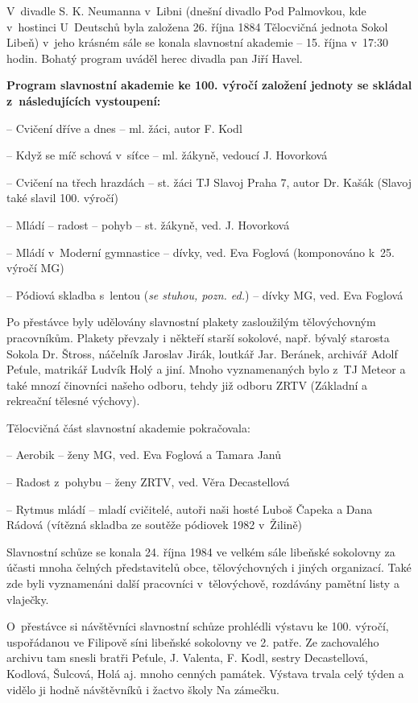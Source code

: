 \documentclass[a5paper, 12pt, twoside]{article}
\begin{document}
V~divadle S. K. Neumanna v~Libni (dnešní divadlo Pod Palmovkou, kde
v~hostinci U~Deutschů byla založena 26. října 1884 Tělocvičná jednota
Sokol Libeň) v~jeho krásném sále se konala slavnostní akademie -- 15.
října v~17:30 hodin. Bohatý program uváděl herec divadla pan Jiří Havel.

\textbf{Program slavnostní akademie ke 100. výročí založení jednoty se
skládal z~následujících vystoupení:}

-- Cvičení dříve a dnes -- ml. žáci, autor F. Kodl

-- Když se míč schová v~síťce -- ml. žákyně, vedoucí J. Hovorková

-- Cvičení na třech hrazdách -- st. žáci TJ Slavoj Praha 7, autor Dr.
Kašák (Slavoj také slavil 100. výročí)

-- Mládí -- radost -- pohyb -- st. žákyně, ved. J. Hovorková

-- Mládí v~Moderní gymnastice -- dívky, ved. Eva Foglová (komponováno
k~25. výročí MG)

-- Pódiová skladba s~lentou (\textit{se stuhou, pozn. ed.}) -- dívky MG,
ved. Eva Foglová

Po přestávce byly udělovány slavnostní plakety zasloužilým tělovýchovným
pracovníkům. Plakety převzaly i někteří starší sokolové, např. bývalý
starosta Sokola Dr. Štross, náčelník Jaroslav Jirák, loutkář Jar.
Beránek, archivář Adolf Peťule, matrikář Ludvík Holý a jiní. Mnoho
vyznamenaných bylo z~TJ Meteor a také mnozí činovníci našeho odboru,
tehdy již odboru ZRTV (Základní a rekreační tělesné výchovy).

Tělocvičná část slavnostní akademie pokračovala:

-- Aerobik -- ženy MG, ved. Eva Foglová a Tamara Janů

-- Radost z~pohybu -- ženy ZRTV, ved. Věra Decastellová

-- Rytmus mládí -- mladí cvičitelé, autoři naši hosté Luboš Čapeka a
Dana Rádová (vítězná skladba ze soutěže pódiovek 1982 v~Žilině)

Slavnostní schůze se konala 24. října 1984 ve velkém sále libeňské
sokolovny za účasti mnoha čelných představitelů obce, tělovýchovných i
jiných organizací. Také zde byli vyznamenáni další pracovníci
v~tělovýchově, rozdávány pamětní listy a vlaječky.

O~přestávce si návštěvníci slavnostní schůze prohlédli výstavu ke 100.
výročí, uspořádanou ve Filipově síni libeňské sokolovny ve 2. patře. Ze
zachovalého archivu tam snesli bratři Peťule, J. Valenta, F. Kodl,
sestry Decastellová, Kodlová, Šulcová, Holá aj. mnoho cenných památek.
Výstava trvala celý týden a vidělo ji hodně návštěvníků i žactvo školy
Na zámečku.
\end{document}
